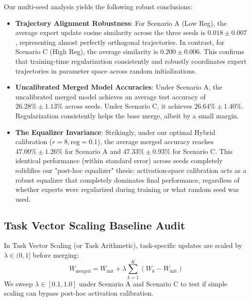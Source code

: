 \documentclass{article}
\theoremstyle{plain}
\theoremstyle{definition}
\theoremstyle{remark}
\begin{document}
Our multi-seed analysis yields the following robust conclusions:
\begin{itemize}\itemsep=0pt \parsep=0pt
    \item \textbf{Trajectory Alignment Robustness}: For Scenario A (Low Reg), the average expert update cosine similarity across the three seeds is $0.018 \pm 0.007$, representing almost perfectly orthogonal trajectories. In contrast, for Scenario C (High Reg), the average similarity is $0.200 \pm 0.006$. This confirms that training-time regularization consistently and robustly coordinates expert trajectories in parameter space across random initializations.
    \item \textbf{Uncalibrated Merged Model Accuracies}: Under Scenario A, the uncalibrated merged model achieves an average test accuracy of $26.28\% \pm 1.13\%$ across seeds. Under Scenario C, it achieves $26.64\% \pm 1.40\%$. Regularization consistently helps the base merge, albeit by a small margin.
    \item \textbf{The Equalizer Invariance}: Strikingly, under our optimal Hybrid calibration ($r=8, \text{reg}=0.1$), the average merged accuracy reaches $47.00\% \pm 1.26\%$ for Scenario A and $47.33\% \pm 0.93\%$ for Scenario C. This identical performance (within standard error) across seeds completely solidifies our "post-hoc equalizer" thesis: activation-space calibration acts as a robust equalizer that completely dominates final performance, regardless of whether experts were regularized during training or what random seed was used.
\end{itemize}

\subsection{Task Vector Scaling Baseline Audit}
In Task Vector Scaling (or Task Arithmetic), task-specific updates are scaled by $\lambda \in (0, 1]$ before merging:
\begin{equation}
    W_{\text{merged}} = W_{\text{init}} + \lambda \sum_{k=1}^K (W_k - W_{\text{init}})
\end{equation}
We sweep $\lambda \in [0.1, 1.0]$ under Scenario A and Scenario C to test if simple scaling can bypass post-hoc activation calibration.
\end{document}
